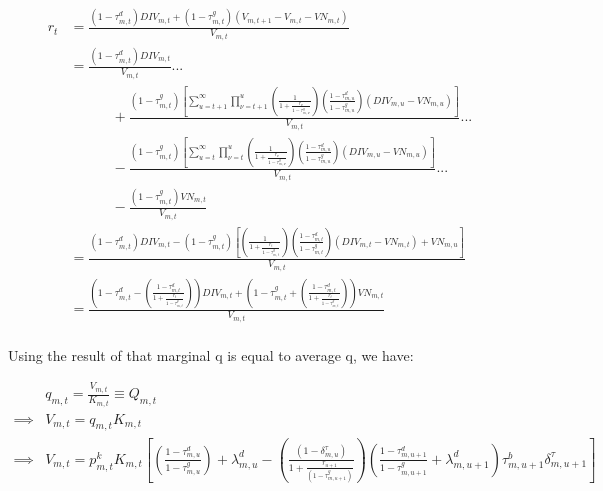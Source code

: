 \documentclass[letterpaper,12pt]{article}
\theoremstyle{definition}
\begin{document}
\begin{spacing}{1.5}
\begin{equation}
\begin{split}
r_{t} & = \frac{(1-\tau^{d}_{m,t})DIV_{m,t} + (1-\tau^{g}_{m,t})\left(V_{m,t+1}-V_{m,t}-VN_{m,t}\right)}{V_{m,t}}\\
& =  \frac{(1-\tau^{d}_{m,t})DIV_{m,t}}{V_{m,t}}... \\  
& \quad\quad\quad + \frac{(1-\tau^{g}_{m,t})\left[\sum_{u=t+1}^{\infty}\prod_{\nu=t+1}^{u}\left(\frac{1}{1+\frac{r_{\nu}}{1-\tau^{g}_{m,\nu}}}\right)\left(\frac{1-\tau^{d}_{m,u}}{1-\tau^{g}_{m,u}}\right)\left(DIV_{m,u}-VN_{m,u}\right)\right]}{V_{m,t}} ...\\
& \quad\quad\quad- \frac{(1-\tau^{g}_{m,t})\left[\sum_{u=t}^{\infty}\prod_{\nu=t}^{u}\left(\frac{1}{1+\frac{r_{\nu}}{1-\tau^{g}_{m,\nu}}}\right)\left(\frac{1-\tau^{d}_{m,u}}{1-\tau^{g}_{m,u}}\right)\left(DIV_{m,u}-VN_{m,u}\right)\right]}{V_{m,t}}... \\
& \quad\quad\quad - \frac{(1-\tau^{g}_{m,t})VN_{m,t}}{V_{m,t}} \\
& = \frac{(1-\tau^{d}_{m,t})DIV_{m,t} - (1-\tau^{g}_{m,t})\left[\left(\frac{1}{1+\frac{r_{t}}{1-\tau^{g}_{m,t}}}\right)\left(\frac{1-\tau^{d}_{m,t}}{1-\tau^{g}_{m,t}}\right)\left(DIV_{m,t}-VN_{m,t}\right)+VN_{m,u}\right]}{V_{m,t}} \\
& = \frac{\left(1-\tau^{d}_{m,t}-\left(\frac{1-\tau^{d}_{m,t}}{1+\frac{r_{t}}{1-\tau^{g}_{m,t}}}\right)\right)DIV_{m,t} + \left(1-\tau^{g}_{m,t}+\left(\frac{1-\tau^{d}_{m,t}}{1+\frac{r_{t}}{1-\tau^{g}_{m,t}}}\right)\right)VN_{m,t}}{V_{m,t}}  \\
\end{split}
\end{equation}


Using the result of \citet{Hayashi1982} that marginal q is equal to average q, we have:

\begin{equation}
\begin{split}
&q_{m,t} = \frac{V_{m,t}}{K_{m,t}}\equiv Q_{m,t} \\
\implies & V_{m,t}=q_{m,t}K_{m,t} \\
\implies & V_{m,t}=p^{k}_{m,t}K_{m,t}\left[\left(\frac{1-\tau^{d}_{m,u}}{1-\tau^{g}_{m,u}}\right) + \lambda^{d}_{m,u} -  \left(\frac{(1-\delta^{\tau}_{m,u})}{1+\frac{r_{u+1}}{(1-\tau^{g}_{m,u+1})}}\right)  \left(\frac{1-\tau^{d}_{m,u+1}}{1-\tau^{g}_{m,u+1}}+\lambda^{d}_{m,u+1}\right)\tau^{b}_{m,u+1}\delta^{\tau}_{m,u+1} \right]  \\
\end{split}
\end{equation}



\end{spacing}
\end{document}
